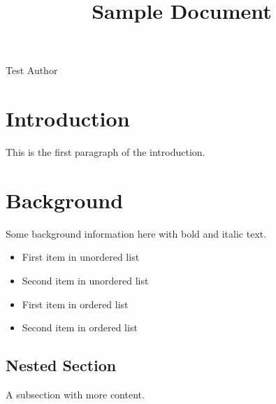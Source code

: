 \documentclass[11pt,a4paper]{article}
\title{Sample Document}
\begin{document}
\maketitle

Test Author

\section{Introduction}

This is the first paragraph of the introduction.

\section{Background}

Some background information here with bold and italic text.

\begin{itemize}
\item First item in unordered list
\item Second item in unordered list
\end{itemize}

\begin{itemize}
\item First item in ordered list
\item Second item in ordered list
\end{itemize}

\subsection{Nested Section}

A subsection with more content.
\end{document}
